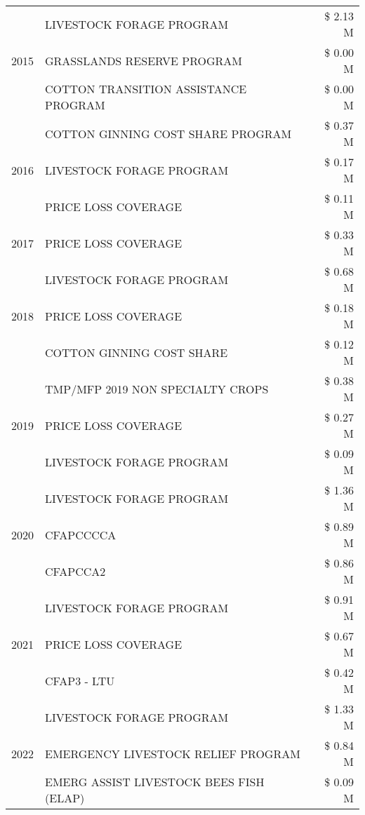 \begin{tabular}{llr}
\cline{1-3}
\multirow[t]{3}{*}{2015} & LIVESTOCK FORAGE PROGRAM & \$ 2.13 M \\
 & GRASSLANDS RESERVE PROGRAM & \$ 0.00 M \\
 & COTTON TRANSITION ASSISTANCE PROGRAM & \$ 0.00 M \\
\cline{1-3}
\multirow[t]{3}{*}{2016} & COTTON GINNING COST SHARE PROGRAM & \$ 0.37 M \\
 & LIVESTOCK FORAGE PROGRAM & \$ 0.17 M \\
 & PRICE LOSS COVERAGE & \$ 0.11 M \\
\cline{1-3}
2017 & PRICE LOSS COVERAGE & \$ 0.33 M \\
\cline{1-3}
\multirow[t]{3}{*}{2018} & LIVESTOCK FORAGE PROGRAM & \$ 0.68 M \\
 & PRICE LOSS COVERAGE & \$ 0.18 M \\
 & COTTON GINNING COST SHARE & \$ 0.12 M \\
\cline{1-3}
\multirow[t]{3}{*}{2019} & TMP/MFP 2019 NON SPECIALTY CROPS & \$ 0.38 M \\
 & PRICE LOSS COVERAGE & \$ 0.27 M \\
 & LIVESTOCK FORAGE PROGRAM & \$ 0.09 M \\
\cline{1-3}
\multirow[t]{3}{*}{2020} & LIVESTOCK FORAGE PROGRAM & \$ 1.36 M \\
 & CFAPCCCCA & \$ 0.89 M \\
 & CFAPCCA2 & \$ 0.86 M \\
\cline{1-3}
\multirow[t]{3}{*}{2021} & LIVESTOCK FORAGE PROGRAM & \$ 0.91 M \\
 & PRICE LOSS COVERAGE & \$ 0.67 M \\
 & CFAP3 - LTU & \$ 0.42 M \\
\cline{1-3}
\multirow[t]{3}{*}{2022} & LIVESTOCK FORAGE PROGRAM & \$ 1.33 M \\
 & EMERGENCY LIVESTOCK RELIEF PROGRAM & \$ 0.84 M \\
 & EMERG ASSIST LIVESTOCK BEES FISH (ELAP) & \$ 0.09 M \\
\cline{1-3}
\bottomrule
\end{tabular}
